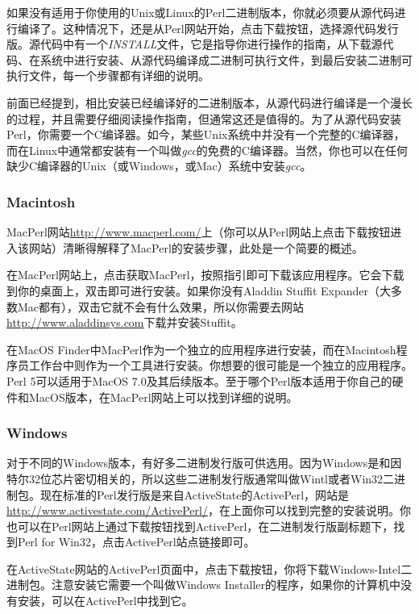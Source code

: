 如果没有适用于你使用的Unix或Linux的Perl二进制版本，你就必须要从源代码进行编译了。这种情况下，还是从Perl网站开始，点击下载按钮，选择源代码发行版。源代码中有一个\textit{INSTALL}文件，它是指导你进行操作的指南，从下载源代码、在系统中进行安装、从源代码编译成二进制可执行文件，到最后安装二进制可执行文件，每一个步骤都有详细的说明。

前面已经提到，相比安装已经编译好的二进制版本，从源代码进行编译是一个漫长的过程，并且需要仔细阅读操作指南，但通常这还是值得的。为了从源代码安装Perl，你需要一个C编译器。如今，某些Unix系统中并没有一个完整的C编译器，而在Linux中通常都安装有一个叫做\textit{gcc}的免费的C编译器。当然，你也可以在任何缺少C编译器的Unix（或Windows，或Mac）系统中安装\textit{gcc}。

\subsubsection{Macintosh}
MacPerl网站\href{http://www.macperl.com/}{http://www.macperl.com/}上（你可以从Perl网站上点击下载按钮进入该网站）清晰得解释了MacPerl的安装步骤，此处是一个简要的概述。

在MacPerl网站上，点击获取MacPerl，按照指引即可下载该应用程序。它会下载到你的桌面上，双击即可进行安装。如果你没有Aladdin Stuffit Expander（大多数Mac都有），双击它就不会有什么效果，所以你需要去网站\href{http://www.aladdinsys.com}{http://www.aladdinsys.com}下载并安装Stuffit。

在MacOS Finder中MacPerl作为一个独立的应用程序进行安装，而在Macintosh程序员工作台中则作为一个工具进行安装。你想要的很可能是一个独立的应用程序。Perl 5可以适用于MacOS 7.0及其后续版本。至于哪个Perl版本适用于你自己的硬件和MacOS版本，在MacPerl网站上可以找到详细的说明。

\subsubsection{Windows}
对于不同的Windows版本，有好多二进制发行版可供选用。因为Windows是和因特尔32位芯片密切相关的，所以这些二进制发行版通常叫做Wintl或者Win32二进制包。现在标准的Perl发行版是来自ActiveState的ActivePerl，网站是\href{http://www.activestate.com/ActivePerl/}{http://www.activestate.com/ActivePerl/}，在上面你可以找到完整的安装说明。你也可以在Perl网站上通过下载按钮找到ActivePerl，在二进制发行版副标题下，找到Perl for Win32，点击ActivePerl站点链接即可。

在ActiveState网站的ActivePerl页面中，点击下载按钮，你将下载Windows-Intel二进制包。注意安装它需要一个叫做Windows Installer的程序，如果你的计算机中没有安装，可以在ActivePerl中找到它。

